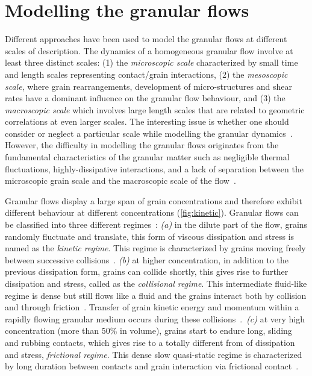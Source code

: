 \section{Modelling the granular flows}

Different approaches have been used to model the granular flows at different 
scales of description. The dynamics of a homogeneous granular flow involve at 
least three distinct scales: (1) the \textit{microscopic scale} characterized 
by small time and length scales representing contact/grain interactions, (2) 
the \textit{mesoscopic scale}, where grain rearrangements, development of 
micro-structures and shear rates have a dominant influence on the granular flow 
behaviour, and (3) the \textit{macroscopic scale} which involves large length 
scales that are related to geometric correlations at even larger scales. The 
interesting issue is whether one should consider or neglect a particular scale 
while modelling the granular dynamics~\citep{Radjai2009}. However, the 
difficulty in modelling the granular flows originates from the fundamental 
characteristics of the granular matter such as negligible thermal fluctuations, 
highly-dissipative interactions, and a lack of separation between the 
microscopic grain scale and the macroscopic scale of the 
flow~\citep{Goldhirsch2003}. 


Granular flows display a large span of grain concentrations and therefore 
exhibit different behaviour at different concentrations (\cref{fig:kinetic}). 
Granular flows can be classified into three different 
regimes~\citep{Jaeger1996}: \textit{(a)} in the dilute part of the flow, grains 
randomly fluctuate and translate, this form of viscous dissipation and stress 
is named as the \textit{kinetic regime}. This regime is characterized by grains 
moving freely between successive collisions~\citep{Goldhirsch2003}. 
\textit{(b)} at higher concentration, in addition to the previous dissipation 
form, grains can collide shortly, this gives rise to further dissipation and 
stress, called as the \textit{collisional regime}. This intermediate fluid-like 
regime is dense but still flows like a fluid and the grains interact both by 
collision and through friction~\citep{Midi2004,Pouliquen2002}. Transfer of 
grain kinetic energy and momentum within a rapidly flowing granular medium 
occurs during these collisions~\citep{Popken1999}.~\textit{(c)} at very high 
concentration (more than 50\% in volume), grains start to endure long, sliding 
and rubbing contacts, which gives rise to a totally different from of 
dissipation and stress, \textit{frictional regime}. This dense slow 
quasi-static regime is characterized by long duration between contacts and 
grain interaction via frictional contact~\citep{Roux2002}. 


